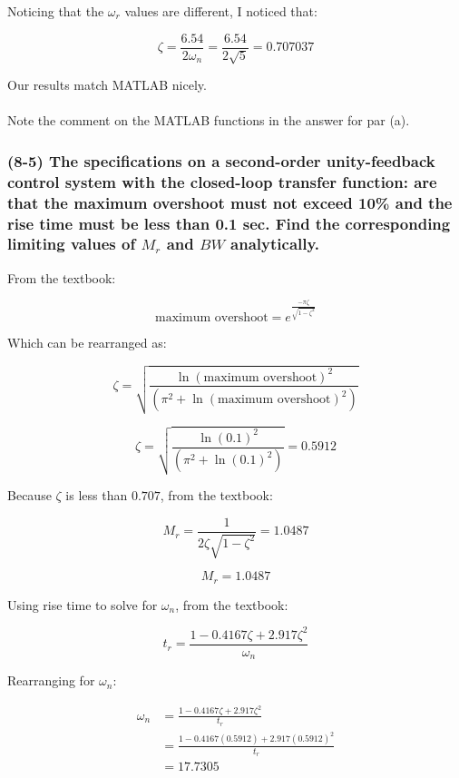 \documentclass[12pt, letterpaper]{../assignment}
\begin{document}
Noticing that the $\omega_r$ values are different, I noticed that:

$$ \zeta = \frac{6.54}{2 \omega_n} = \frac{6.54}{2 \sqrt{5}} = 0.707037 $$

Our results match MATLAB nicely.
\\\\
Note the comment on the MATLAB functions in the answer for par (a).

\subsubsection*{(8-5) The specifications on a second-order unity-feedback control system with the closed-loop transfer function:
are that the maximum overshoot must not exceed 10\% and the rise time must be less than 0.1 sec. Find the corresponding limiting values of $M_r$ and $BW$ analytically.}

From the textbook:

$$ \text{maximum overshoot} = e^\frac{-\pi\zeta}{\sqrt{1- \zeta^2}} $$

Which can be rearranged as:

$$ \zeta = \sqrt{\frac{\ln(\text{maximum overshoot})^2}{(\pi^2 + \ln(\text{maximum overshoot})^2)}} $$

$$ \zeta = \sqrt{\frac{\ln(\text{0.1})^2}{(\pi^2 + \ln(\text{0.1})^2)}} = 0.5912 $$

Because $\zeta$ is less than $0.707$, from the textbook:

$$ M_r = \frac{1}{2 \zeta \sqrt{1- \zeta^2}} = 1.0487$$

\begin{answer}
    $$ M_r = 1.0487 $$
\end{answer}

Using rise time to solve for $\omega_n$, from the textbook:

$$ t_r = \frac{1 - 0.4167 \zeta + 2.917 \zeta^2}{\omega_n}$$

Rearranging for $\omega_n$:

\begin{equation*}
    \begin{aligned}
        \omega_n &= \frac{1 - 0.4167 \zeta + 2.917 \zeta^2}{t_r}\\
                 &= \frac{1 - 0.4167 (0.5912) + 2.917 (0.5912)^2}{t_r}\\
                 &= 17.7305
    \end{aligned}
\end{equation*}
\end{document}
